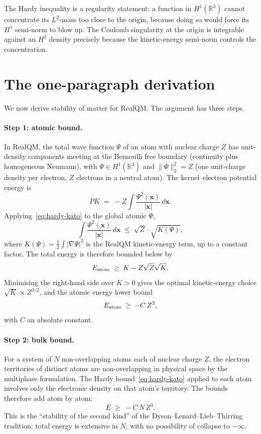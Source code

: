 The Hardy inequality is a regularity statement: a function in $H^1(\mathbb{R}^3)$ cannot concentrate its $L^2$-mass too close to the origin, because doing so would force its $H^1$ semi-norm to blow up. The Coulomb singularity at the origin is integrable against an $H^1$ density precisely because the kinetic-energy semi-norm controls the concentration.

\section{The one-paragraph derivation}\label{sec:som-derivation}

We now derive stability of matter for RealQM. The argument has three steps.

\paragraph{Step 1: atomic bound.}
In RealQM, the total wave function $\Psi$ of an atom with nuclear charge $Z$ has unit-density components meeting at the Bernoulli free boundary (continuity plus homogeneous Neumann), with $\Psi \in H^1(\mathbb{R}^3)$ and $\|\Psi\|_2^2 = Z$ (one unit-charge density per electron, $Z$ electrons in a neutral atom). The kernel--electron potential energy is
\[
PK \;=\; -Z \int \frac{\Psi^2(\mathbf{x})}{|\mathbf{x}|}\, d\mathbf{x}.
\]
Applying~\eqref{eq:hardy-kato} to the global atomic $\Psi$,
\[
\int \frac{\Psi^2(\mathbf{x})}{|\mathbf{x}|}\, d\mathbf{x} \;\le\; \sqrt{Z} \cdot \sqrt{K(\Psi)},
\]
where $K(\Psi) = \tfrac{1}{2}\int |\nabla\Psi|^2$ is the RealQM kinetic-energy term, up to a constant factor. The total energy is therefore bounded below by
\[
E_{\rm atom} \;\ge\; K - Z \sqrt{Z} \sqrt{K}.
\]
Minimising the right-hand side over $K > 0$ gives the optimal kinetic-energy choice $\sqrt{K} \propto Z^{3/2}$, and the atomic energy lower bound
\begin{equation}\label{eq:atom-bound}
E_{\rm atom} \;\ge\; -C\, Z^3,
\end{equation}
with $C$ an absolute constant.

\paragraph{Step 2: bulk bound.}
For a system of $N$ non-overlapping atoms each of nuclear charge $Z$, the electron territories of distinct atoms are non-overlapping in physical space by the multiphase formulation. The Hardy bound~\eqref{eq:hardy-kato} applied to each atom involves only the electronic density on that atom's territory. The bounds therefore add atom by atom:
\begin{equation}\label{eq:bulk-bound}
E \;\ge\; -C\, N\, Z^3.
\end{equation}
This is the ``stability of the second kind'' of the Dyson--Lenard--Lieb--Thirring tradition: total energy is extensive in $N$, with no possibility of collapse to $-\infty$.

